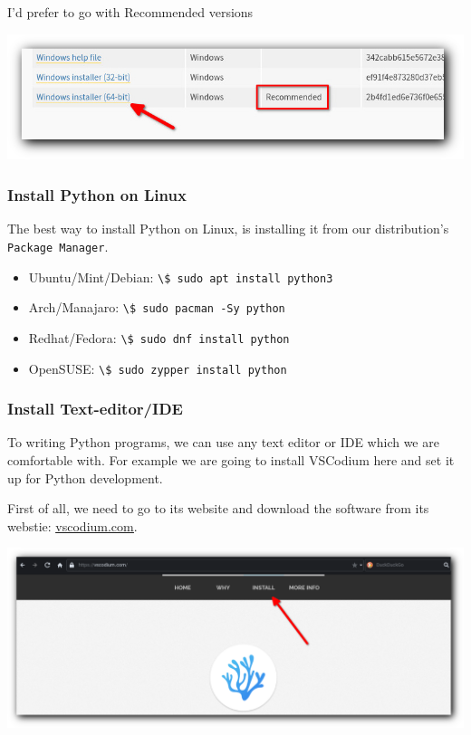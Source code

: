 \documentclass[12pt,a4paper]{article}
\newcommand{\code}[1]{%
	\colorbox{backcolour}{\lstinline{#1}}%
}
\begin{document}
I'd prefer to go with \textsf{Recommended} versions

\begin{center}
	\includegraphics[width=.9\textwidth]{shots/installation/python-download.png}
\end{center}
\subsubsection{Install Python on Linux}
The best way to install Python on Linux, is installing it from
our distribution's \texttt{Package Manager}.

\begin{itemize}
\item {Ubuntu/Mint/Debian:}
	\code{\$ sudo apt install python3}

\item {Arch/Manajaro:}
	\code{\$ sudo pacman -Sy python}

\item {Redhat/Fedora:}
	\code{\$ sudo dnf install python}

\item {OpenSUSE:}
	\code{\$ sudo zypper install python}
\end{itemize}
\subsubsection{Install Text-editor/IDE}
To writing Python programs, we can use any text editor or IDE
which we are comfortable with.
For example we are going to install \textsf{VSCodium} here
and set it up for Python development.

First of all, we need to go to its website and download the software
from its webstie:
\underline{\href{https://vscodium.com}{vscodium.com}}.

\begin{center}
	\includegraphics[width=.9\textwidth]{shots/installation/vscodium-page.png}
\end{center}
\end{document}
